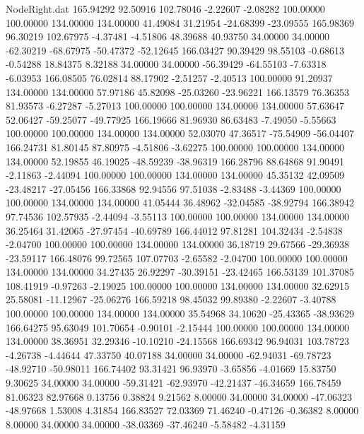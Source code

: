 \begin{filecontents}{NodeRight.dat}
 165.94292   92.50916  102.78046    -2.22607   -2.08282  100.00000  100.00000  134.00000  134.00000   41.49084   31.21954  -24.68399  -23.09555
 165.98369   96.30219  102.67975    -4.37481   -4.51806   48.39688   40.93750   34.00000   34.00000  -62.30219  -68.67975  -50.47372  -52.12645
 166.03427   90.39429   98.55103    -0.68613   -0.54288   18.84375    8.32188   34.00000   34.00000  -56.39429  -64.55103   -7.63318   -6.03953
 166.08505   76.02814   88.17902    -2.51257   -2.40513  100.00000   91.20937  134.00000  134.00000   57.97186   45.82098  -25.03260  -23.96221
 166.13579   76.36353   81.93573    -6.27287   -5.27013  100.00000  100.00000  134.00000  134.00000   57.63647   52.06427  -59.25077  -49.77925
 166.19666   81.96930   86.63483    -7.49050   -5.55663  100.00000  100.00000  134.00000  134.00000   52.03070   47.36517  -75.54909  -56.04407
 166.24731   81.80145   87.80975    -4.51806   -3.62275  100.00000  100.00000  134.00000  134.00000   52.19855   46.19025  -48.59239  -38.96319
 166.28796   88.64868   91.90491    -2.11863   -2.44094  100.00000  100.00000  134.00000  134.00000   45.35132   42.09509  -23.48217  -27.05456
 166.33868   92.94556   97.51038    -2.83488   -3.44369  100.00000  100.00000  134.00000  134.00000   41.05444   36.48962  -32.04585  -38.92794
 166.38942   97.74536  102.57935    -2.44094   -3.55113  100.00000  100.00000  134.00000  134.00000   36.25464   31.42065  -27.97454  -40.69789
 166.44012   97.81281  104.32434    -2.54838   -2.04700  100.00000  100.00000  134.00000  134.00000   36.18719   29.67566  -29.36938  -23.59117
 166.48076   99.72565  107.07703    -2.65582   -2.04700  100.00000  100.00000  134.00000  134.00000   34.27435   26.92297  -30.39151  -23.42465
 166.53139  101.37085  108.41919    -0.97263   -2.19025  100.00000  100.00000  134.00000  134.00000   32.62915   25.58081  -11.12967  -25.06276
 166.59218   98.45032   99.89380    -2.22607   -3.40788  100.00000  100.00000  134.00000  134.00000   35.54968   34.10620  -25.43365  -38.93629
 166.64275   95.63049  101.70654    -0.90101   -2.15444  100.00000  100.00000  134.00000  134.00000   38.36951   32.29346  -10.10210  -24.15568
 166.69342   96.94031  103.78723    -4.26738   -4.44644   47.33750   40.07188   34.00000   34.00000  -62.94031  -69.78723  -48.92710  -50.98011
 166.74402   93.31421   96.93970    -3.65856   -4.01669   15.83750    9.30625   34.00000   34.00000  -59.31421  -62.93970  -42.21437  -46.34659
 166.78459   81.06323   82.97668     0.13756    0.38824    9.21562    8.00000   34.00000   34.00000  -47.06323  -48.97668    1.53008    4.31854
 166.83527   72.03369   71.46240    -0.47126   -0.36382    8.00000    8.00000   34.00000   34.00000  -38.03369  -37.46240   -5.58482   -4.31159

\end{filecontents}
